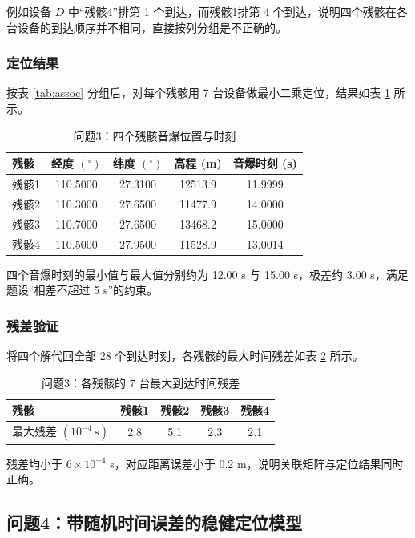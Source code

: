 \documentclass[12pt,a4paper]{article}
\begin{document}
例如设备 $D$ 中“残骸4”排第 1 个到达，而残骸1排第 4 个到达，说明四个残骸在各台设备的到达顺序并不相同，直接按列分组是不正确的。

\subsubsection{定位结果}

按表 \ref{tab:assoc} 分组后，对每个残骸用 7 台设备做最小二乘定位，结果如表 \ref{tab:q3} 所示。

\begin{table}[H]
\centering
\caption{问题3：四个残骸音爆位置与时刻}
\label{tab:q3}
\begin{tabular}{lcccc}
\toprule
残骸 & 经度 $(^{\circ})$ & 纬度 $(^{\circ})$ & 高程 (m) & 音爆时刻 (s) \\
\midrule
残骸1 & 110.5000 & 27.3100 & 12513.9 & 11.9999 \\
残骸2 & 110.3000 & 27.6500 & 11477.9 & 14.0000 \\
残骸3 & 110.7000 & 27.6500 & 13468.2 & 15.0000 \\
残骸4 & 110.5000 & 27.9500 & 11528.9 & 13.0014 \\
\bottomrule
\end{tabular}
\end{table}

四个音爆时刻的最小值与最大值分别约为 12.00 s 与 15.00 s，极差约 3.00 s，满足题设“相差不超过 5 s”的约束。

\subsubsection{残差验证}

将四个解代回全部 28 个到达时刻，各残骸的最大时间残差如表 \ref{tab:q3res} 所示。

\begin{table}[H]
\centering
\caption{问题3：各残骸的 7 台最大到达时间残差}
\label{tab:q3res}
\begin{tabular}{lcccc}
\toprule
残骸 & 残骸1 & 残骸2 & 残骸3 & 残骸4 \\
\midrule
最大残差 $(10^{-4}\ \mathrm{s})$ & 2.8 & 5.1 & 2.3 & 2.1 \\
\bottomrule
\end{tabular}
\end{table}

残差均小于 $6\times10^{-4}$ s，对应距离误差小于 0.2 m，说明关联矩阵与定位结果同时正确。

\subsection{问题4：带随机时间误差的稳健定位模型}
\end{document}

